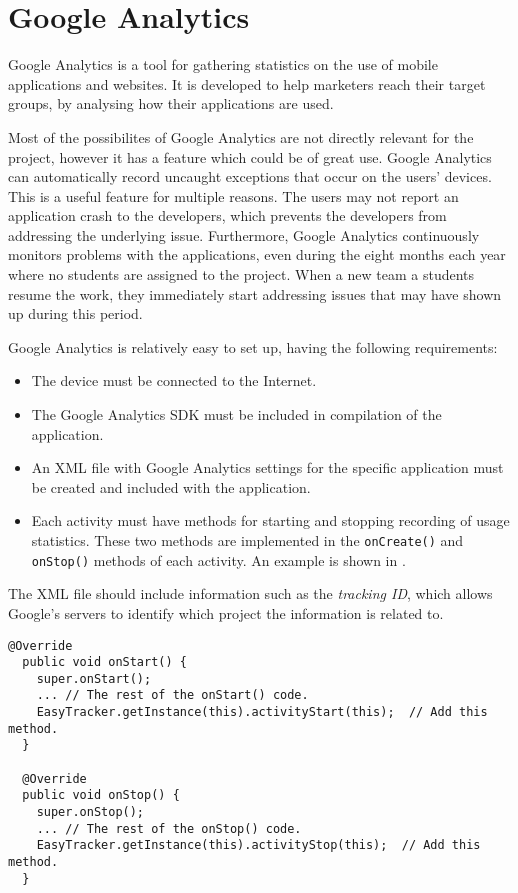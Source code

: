 \section{Google Analytics}

Google Analytics is a tool for gathering statistics on the use of mobile applications and websites. 
It is developed to help marketers reach their target groups, by analysing how their applications are used.

Most of the possibilites of Google Analytics are not directly relevant for the \giraf project, however it has a feature which could be of great use.
Google Analytics can automatically record uncaught exceptions that occur on the users' devices.
This is a useful feature for multiple reasons. The users may not report an application crash to the developers, which prevents the developers from addressing the underlying issue. Furthermore, Google Analytics continuously monitors problems with the applications, even during the eight months each year where no students are assigned to the project. When a new team a students resume the work, they immediately start addressing issues that may have shown up during this period.

Google Analytics is relatively easy to set up, having the following requirements:
\begin{itemize}
\item The device must be connected to the Internet.
\item The Google Analytics SDK must be included in compilation of the application.
\item An XML file with Google Analytics settings for the specific application must be created and included with the application.
\item Each activity must have methods for starting and stopping recording of usage statistics. These two methods are implemented in the \lstinline{onCreate()} and \lstinline{onStop()} methods of each activity. An example is shown in .
\end{itemize}
The XML file should include information such as the \textit{tracking ID}, which allows Google's servers to identify which project the information is related to.

\begin{lstlisting}[caption={The code that needs to be added to \lstinline{OnCreate()} and \lstinline{OnStop()} methods.}, label={lst:googleanalystics}]
  @Override
  public void onStart() {
    super.onStart();
    ... // The rest of the onStart() code.
    EasyTracker.getInstance(this).activityStart(this);  // Add this method.
  }

  @Override
  public void onStop() {
    super.onStop();
    ... // The rest of the onStop() code.
    EasyTracker.getInstance(this).activityStop(this);  // Add this method.
  }
\end{lstlisting}

